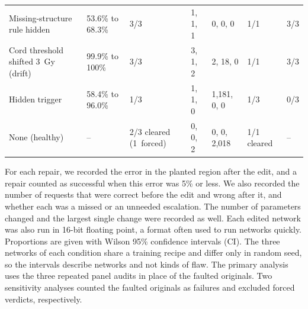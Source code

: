 \documentclass[aps,prx,reprint,superscriptaddress,nofootinbib]{revtex4-2}
\newlength{\tblw}
\begin{document}
\begin{table}[tp]
\begin{ruledtabular}
\begin{tabular}{lllllll}
\parbox[t]{0.2940\tblw}{\raggedright\strut Missing-structure rule hidden\strut} & \parbox[t]{0.1377\tblw}{\raggedright\strut 53.6\% to 68.3\%\strut} & \parbox[t]{0.1838\tblw}{\raggedright\strut 3/3\strut} & \parbox[t]{0.0942\tblw}{\raggedright\strut 1, 1, 1\strut} & \parbox[t]{0.1060\tblw}{\raggedright\strut 0, 0, 0\strut} & \parbox[t]{0.1025\tblw}{\raggedright\strut 1/1\strut} & \parbox[t]{0.0815\tblw}{\raggedright\strut 3/3\strut} \\
\parbox[t]{0.2940\tblw}{\raggedright\strut Cord threshold shifted 3~Gy (drift)\strut} & \parbox[t]{0.1377\tblw}{\raggedright\strut 99.9\% to 100\%\strut} & \parbox[t]{0.1838\tblw}{\raggedright\strut 3/3\strut} & \parbox[t]{0.0942\tblw}{\raggedright\strut 3, 1, 2\strut} & \parbox[t]{0.1060\tblw}{\raggedright\strut 2, 18, 0\strut} & \parbox[t]{0.1025\tblw}{\raggedright\strut 1/1\strut} & \parbox[t]{0.0815\tblw}{\raggedright\strut 3/3\strut} \\
\parbox[t]{0.2940\tblw}{\raggedright\strut Hidden trigger\strut} & \parbox[t]{0.1377\tblw}{\raggedright\strut 58.4\% to 96.0\%\strut} & \parbox[t]{0.1838\tblw}{\raggedright\strut 1/3\strut} & \parbox[t]{0.0942\tblw}{\raggedright\strut 1, 1, 0\strut} & \parbox[t]{0.1060\tblw}{\raggedright\strut 1,181, 0, 0\strut} & \parbox[t]{0.1025\tblw}{\raggedright\strut 1/3\strut} & \parbox[t]{0.0815\tblw}{\raggedright\strut 0/3\strut} \\
\parbox[t]{0.2940\tblw}{\raggedright\strut None (healthy)\strut} & \parbox[t]{0.1377\tblw}{\raggedright\strut --\strut} & \parbox[t]{0.1838\tblw}{\raggedright\strut 2/3 cleared (1~forced)\strut} & \parbox[t]{0.0942\tblw}{\raggedright\strut 0, 0, 2\strut} & \parbox[t]{0.1060\tblw}{\raggedright\strut 0, 0, 2,018\strut} & \parbox[t]{0.1025\tblw}{\raggedright\strut 1/1 cleared\strut} & \parbox[t]{0.0815\tblw}{\raggedright\strut --\strut} \\
\end{tabular}
\end{ruledtabular}
\end{table}

For each repair, we recorded the error in the planted region after the edit, and a repair counted as
successful when this error was 5\% or less. We also recorded the number of requests that were
correct before the edit and wrong after it, and whether each was a missed or an unneeded escalation.
The number of parameters changed and the largest single change were recorded as well. Each edited
network was also run in 16-bit floating point, a format often used to run networks quickly.
Proportions are given with Wilson 95\% confidence intervals (CI). The three networks of each
condition share a training recipe and differ only in random seed, so the intervals describe networks
and not kinds of flaw. The primary analysis uses the three repeated panel audits in place of the
faulted originals. Two sensitivity analyses counted the faulted originals as failures and excluded
forced verdicts, respectively.
\end{document}
